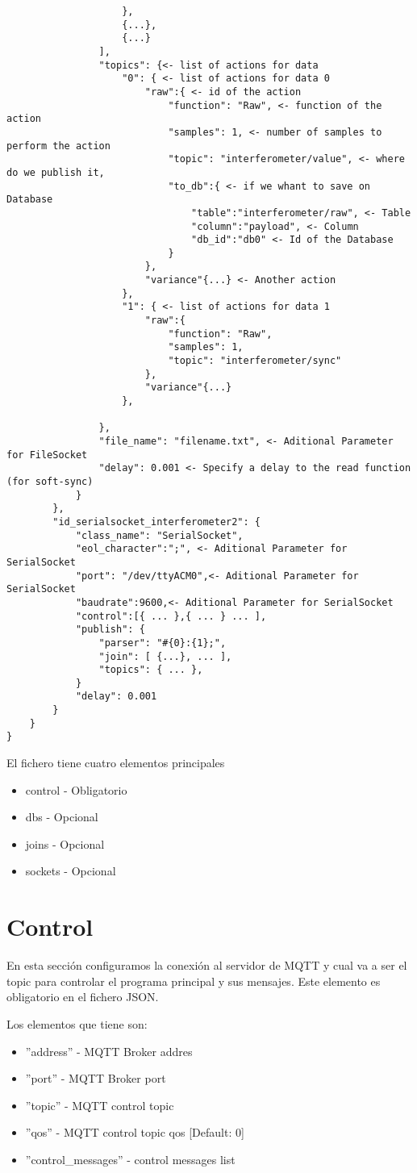 \documentclass[12pt, a4paper, oneside, titlepage]{article}
\begin{document}
\begin{lstlisting}
					},
					{...}, 
					{...}
				],
				"topics": {<- list of actions for data
					"0": { <- list of actions for data 0
						"raw":{ <- id of the action
							"function": "Raw", <- function of the action
							"samples": 1, <- number of samples to perform the action
							"topic": "interferometer/value", <- where do we publish it,
							"to_db":{ <- if we whant to save on Database
								"table":"interferometer/raw", <- Table
								"column":"payload", <- Column
								"db_id":"db0" <- Id of the Database
							}
						},
						"variance"{...} <- Another action
                    },
					"1": { <- list of actions for data 1
						"raw":{
							"function": "Raw",
							"samples": 1,
							"topic": "interferometer/sync"
						},
						"variance"{...}
					},
                    
				},
				"file_name": "filename.txt", <- Aditional Parameter for FileSocket
				"delay": 0.001 <- Specify a delay to the read function (for soft-sync)
			}
		},
		"id_serialsocket_interferometer2": {
			"class_name": "SerialSocket",
			"eol_character":";", <- Aditional Parameter for SerialSocket
			"port": "/dev/ttyACM0",<- Aditional Parameter for SerialSocket
			"baudrate":9600,<- Aditional Parameter for SerialSocket
			"control":[{ ... },{ ... } ... ],
			"publish": {
				"parser": "#{0}:{1};",
				"join": [ {...}, ... ],
				"topics": { ... },
			}
			"delay": 0.001
		}
	}
}

\end{lstlisting}

El fichero tiene cuatro elementos principales

\begin{itemize}
\item control - Obligatorio
\item dbs  - Opcional
\item joins  - Opcional
\item sockets  - Opcional
\end{itemize}

\section{Control}

En esta sección configuramos la conexión al servidor de MQTT y cual va a ser el topic para controlar el programa principal y sus mensajes. Este elemento es obligatorio en el fichero JSON.

Los elementos que tiene son:

\begin{itemize}
\item		''address'' - MQTT Broker addres
\item		''port'' - MQTT Broker port
\item		''topic'' - MQTT control topic
\item		''qos'' - MQTT control topic qos [Default: 0]
\item		''control\_messages'' - control messages list
\end{itemize}
\end{document}
